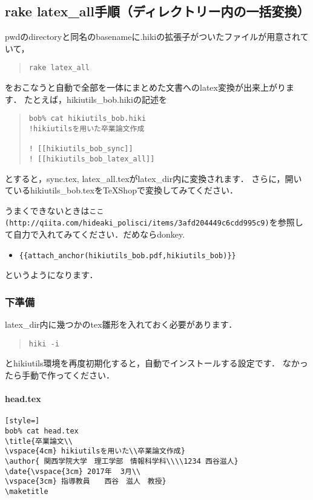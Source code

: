 \subsection{rake latex\_all手順（ディレクトリー内の一括変換）}
pwdのdirectoryと同名のbasenameに.hikiの拡張子がついたファイルが用意されていて，
\begin{quote}\begin{verbatim}
rake latex_all
\end{verbatim}\end{quote}
をおこなうと自動で全部を一体にまとめた文書へのlatex変換が出来上がります．
たとえば，hikiutils\_bob.hikiの記述を
\begin{quote}\begin{verbatim}
bob% cat hikiutils_bob.hiki 
!hikiutilsを用いた卒業論文作成

! [[hikiutils_bob_sync]]
! [[hikiutils_bob_latex_all]]

\end{verbatim}\end{quote}
とすると，sync.tex, latex\_all.texがlatex\_dir内に変換されます．
さらに，開いているhikiutils\_bob.texをTeXShopで変換してみてください．

うまくできないときは\verb|ここ(http://qiita.com/hideaki_polisci/items/3afd204449c6cdd995c9)|を参照して自力で入れてみてください．だめならdonkey.
\begin{itemize}
\item \verb|{{attach_anchor(hikiutils_bob.pdf,hikiutils_bob)}}|
\end{itemize}
というようになります．

\subsubsection{下準備}
latex\_dir内に幾つかのtex雛形を入れておく必要があります．
\begin{quote}\begin{verbatim}
hiki -i
\end{verbatim}\end{quote}
とhikiutils環境を再度初期化すると，自動でインストールする設定です．
なかったら手動で作ってください．

\paragraph{head.tex}\begin{lstlisting}[style=]
bob% cat head.tex
\title{卒業論文\\
\vspace{4cm} hikiutilsを用いた\\卒業論文作成}
\author{ 関西学院大学　理工学部　情報科学科\\\\1234 西谷滋人}
\date{\vspace{3cm} 2017年  3月\\
\vspace{3cm} 指導教員　　西谷　滋人　教授}
\maketitle

\end{lstlisting}
